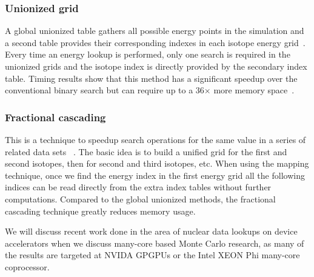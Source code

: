 \subsubsection*{\textbf{Unionized grid}} A global unionized table gathers all possible energy points in the simulation and a second table provides their corresponding indexes in each isotope energy grid~\cite{leppanen2009two}. Every time an energy lookup is performed, only one search is required in the unionized grids and the isotope index is directly provided by the secondary index table. Timing results show that this method has a significant speedup over the conventional binary search but can require up to a 36$\times$ more memory space~\cite{a.l.lunda.r.siegel2015}.
%
\subsubsection*{\textbf{Fractional cascading}} This is a technique to speedup search operations for the same value in a series of related data sets ~\cite{a.l.lunda.r.siegel2015}. The basic idea is to build a unified grid for the first and second isotopes, then for second and third isotopes, etc. When using the mapping technique, once we find the energy index in the first energy grid all the following indices can be read directly from the extra index tables without further computations. Compared to the global unionized methods, the fractional cascading technique greatly reduces memory usage.

%
We will discuss recent work done in the area of nuclear data lookups on device accelerators when we discuss many-core based Monte Carlo research, as many of the results are targeted at NVIDA GPGPUs or the Intel XEON Phi many-core coprocessor. 
